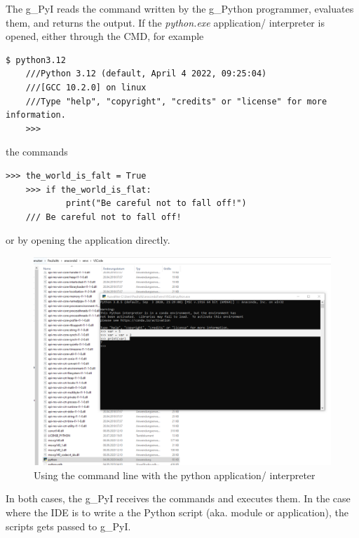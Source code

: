 The \gls{g_PyI} reads the command written by the \gls{g_Python} programmer, evaluates them, and returns the output. If the \textit{python.exe} application/ interpreter is opened, either through the \gls{CMD}, for example  
\begin{lstlisting}[style=CMD]
	$ python3.12
	///Python 3.12 (default, April 4 2022, 09:25:04)
	///[GCC 10.2.0] on linux
	///Type "help", "copyright", "credits" or "license" for more information.
	>>>
\end{lstlisting}
the commands
\begin{lstlisting}[style=CMD]
	>>> the_world_is_falt = True
	>>> if the_world_is_flat:
			print("Be careful not to fall off!")
	/// Be careful not to fall off!
\end{lstlisting}
or by opening the application directly.
\begin{figure}[H]
	\centering
	\includegraphics[scale = 0.2]{attachment/chapter_AML/Scc003}
	\caption{Using the command line with the python application/ interpreter}
\end{figure}
In both cases, the \gls{g_PyI} receives the commands and executes them. In the case where the \gls{IDE} is to write a the Python script (aka. module or application), the scripts gets passed to \gls{g_PyI}.\\

